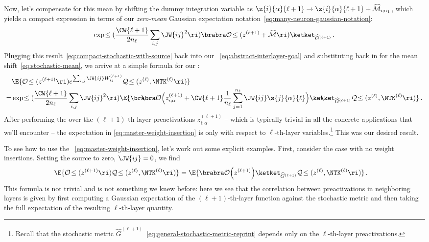Now, let's compensate for this mean by shifting the dummy integration variable as $\z{i}{\alpha}{\ell+1} \to \z{i}{\alpha}{\ell+1} + \widehat{\mathcal{M}}_{i;\alpha_1}$, which yields a compact expression in terms of our \emph{zero-mean} Gaussian expectation notation~\eqref{eq:many-neuron-gaussian-notation}:
\begin{align}\label{eq:compact-stochastic-with-source}
\exp\!\le(\frac{\CW{\ell+1}}{2n_\ell}\sum_{i,j}\JW{ij}^2\ri) \brabra\mathcal{O}\!\le(z^{(\ell+1)}+\widehat{\mathcal{M}}\ri)\ketket_{\widehat{G}^{(\ell+1)}} \, .
\end{align}
Plugging this result~\eqref{eq:compact-stochastic-with-source} back into our ~\eqref{eq:abstract-interlayer-goal} 
and substituting back in for the mean shift~\eqref{eq:stochastic-mean}, we arrive at a simple formula for our :
\begin{align}\label{eq:master-weight-insertion}
&\E{\mathcal{O}\!\le(z^{(\ell+1)}\ri)e^{\sum_{i,j} \JW{ij}W^{(\ell+1)}_{ij}}\mathcal{Q}\!\le(z^{(\ell)},  \NTK^{(\ell)} \ri)}\, \\
=&\exp\!\le(\frac{\CW{\ell+1}}{2n_\ell}\sum_{i,j}\JW{ij}^2\ri) \E{\bra\!\!\!\bra\mathcal{O}\Big(z^{(\ell+1)}_{i;\alpha}+\CW{\ell+1}\frac{1}{n_{\ell}}\sum_{j=1}^{n_{\ell}}\JW{ij}\s{j}{\alpha}{\ell}\Big)\ket\!\!\!\ket_{\widehat{G}^{(\ell+1)}}\mathcal{Q}\!\le(z^{(\ell)},  \NTK^{(\ell)}\ri) }\, .\notag 
\end{align}
After performing the  over the $(\ell+1)$-th-layer preactivations $z^{(\ell+1)}_{i;\alpha}$ -- which is typically trivial in all the concrete applications that we'll encounter -- the expectation in \eqref{eq:master-weight-insertion} is only with respect to $\ell$-th-layer variables.\footnote{Recall that the stochastic metric $\widehat{G}^{(\ell+1)}$~\eqref{eq:general-stochastic-metric-reprint} depends only on the $\ell$-th-layer preactivations.} This was our desired result.

To see how to use the ~\eqref{eq:master-weight-insertion}, let's work out some explicit examples. First, consider the case with no weight insertions. Setting the source to zero, $\JW{ij}=0$, we find
\begin{align}\label{eq:no-weight-insertion-general}
&\E{\mathcal{O}\!\le(z^{(\ell+1)}\ri)\mathcal{Q}\!\le(z^{(\ell)},  \NTK^{(\ell)} \ri)}=\E{\brabra\mathcal{O}\Big(z^{(\ell+1)}\Big)\ketket_{\widehat{G}^{(\ell+1)}}\mathcal{Q}\!\le(z^{(\ell)},  \NTK^{(\ell)}\ri) }\, .%
\end{align}
This formula is not trivial and is not something we knew before: here we see that the correlation between preactivations in neighboring layers is given by first computing a Gaussian expectation of the $(\ell+1)$-th-layer function against the stochastic metric and then taking the full expectation of the resulting $\ell$-th-layer quantity.

